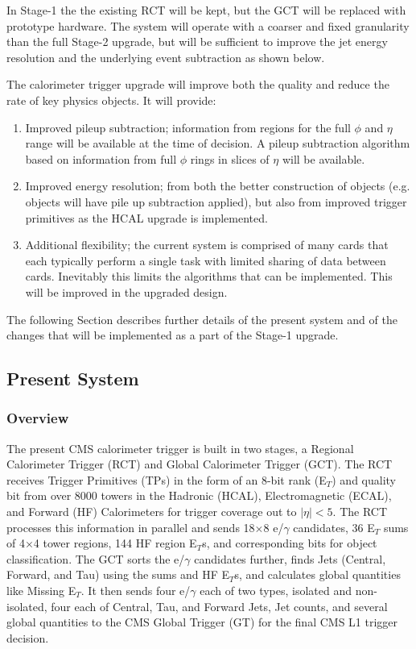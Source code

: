In Stage-1 the the existing RCT will be kept, but the GCT will be replaced with prototype hardware.
The system will operate with a coarser and fixed granularity than the full Stage-2 upgrade,
but will be sufficient to improve the jet energy resolution and the underlying event
subtraction as shown below.

The calorimeter trigger upgrade will improve both the quality and reduce the rate of key physics objects.  It will provide:

\begin{enumerate}
\item Improved pileup subtraction; information from regions for the full $\phi$ and $\eta$ range will be available at the time of 
decision. A pileup subtraction algorithm based on information from  full $\phi$ rings in slices of $\eta$ will be available. 

\item Improved energy resolution; from both the better construction of objects (e.g. objects will have pile up subtraction applied), but also from improved trigger primitives as the HCAL upgrade is implemented.

\item Additional flexibility; the current system is comprised of many cards that each typically perform a single task with limited sharing of data between cards.  Inevitably this limits the algorithms that can be implemented. This will be improved in the upgraded design.
\end{enumerate}

The following Section describes further details of the present system and of the changes that will be implemented as a part of the 
Stage-1 upgrade.

\subsection{Present System\label{calo:present}}

\subsubsection{Overview}

The present CMS calorimeter trigger is built in two stages, a Regional 
Calorimeter Trigger (RCT) and Global Calorimeter Trigger (GCT).  The 
RCT receives Trigger Primitives (TPs) in the form of an 8-bit rank (E$_T$) 
and quality bit from over 8000 towers in the Hadronic (HCAL), Electromagnetic 
(ECAL), and Forward (HF) Calorimeters for trigger coverage out to $|\eta|<5$.  
The RCT processes this information in parallel and sends 18$\times$8 
e/$\gamma$ candidates, 36 E$_T$ sums of 4$\times$4 tower regions, 144 
HF region E$_T$s, and corresponding bits for object classification.  The 
GCT sorts the e/$\gamma$ candidates further, finds Jets (Central, Forward, 
and Tau) using the sums and HF E$_T$s, and calculates global quantities like 
Missing E$_T$. It then sends four e/$\gamma$ each of two types, isolated and 
non-isolated, four each of Central, Tau, and Forward Jets, Jet counts, and 
several global quantities to the CMS Global Trigger (GT) for the final CMS 
L1 trigger decision.

